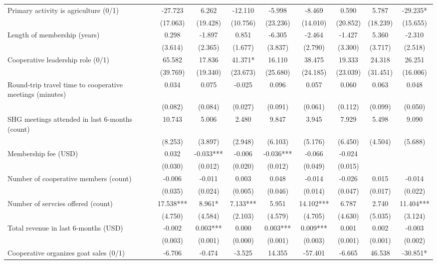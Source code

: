 \documentclass[11pt]{article}
\begin{document}
\begin{landscape}
\begin{table}[H]
{\begin{tabularx}{1.8\linewidth}{lcccccccc}
Primary activity is agriculture (0/1) & -27.723 & 6.262 & -12.110 & -5.998 & -8.469 & 0.590 & 5.787 & -29.235* \\
 & (17.063) & (19.428) & (10.756) & (23.236) & (14.010) & (20.852) & (18.239) & (15.655) \\
Length of membership (years) & 0.298 & -1.897 & 0.851 & -6.305 & -2.464 & -1.427 & 5.360 & -2.310 \\
 & (3.614) & (2.365) & (1.677) & (3.837) & (2.790) & (3.300) & (3.717) & (2.518) \\
Cooperative leadership role (0/1) & 65.582 & 17.836 & 41.371* & 16.110 & 38.475 & 19.333 & 24.318 & 26.251 \\
 & (39.769) & (19.340) & (23.673) & (25.680) & (24.185) & (23.039) & (31.451) & (16.006) \\
Round-trip travel time to cooperative meetings (minutes) & 0.034 & 0.075 & -0.025 & 0.096 & 0.057 & 0.060 & 0.063 & 0.048 \\
 & (0.082) & (0.084) & (0.027) & (0.091) & (0.061) & (0.112) & (0.099) & (0.050) \\
SHG meetings attended in last 6-months (count) & 10.743 & 5.006 & 2.480 & 9.847 & 3.945 & 7.929 & 5.498 & 9.090 \\
 & (8.253) & (3.897) & (2.948) & (6.103) & (5.176) & (6.450) & (4.504) & (5.688) \\
Membership fee (USD) & 0.032 & -0.033*** & -0.006 & -0.036*** & -0.066 & -0.024 &  &  \\
 & (0.030) & (0.012) & (0.020) & (0.012) & (0.049) & (0.015) &  &  \\
Number of cooperative members (count) & -0.006 & -0.011 & 0.003 & 0.048 & -0.014 & -0.026 & 0.015 & -0.014 \\
 & (0.035) & (0.024) & (0.005) & (0.046) & (0.014) & (0.047) & (0.017) & (0.022) \\
Number of servcies offered (count) & 17.538*** & 8.961* & 7.133*** & 5.951 & 14.102*** & 6.787 & 2.740 & 11.404*** \\
 & (4.750) & (4.584) & (2.103) & (4.579) & (4.705) & (4.630) & (5.035) & (3.124) \\
Total revenue in last 6-months (USD) & -0.002 & 0.003*** & 0.000 & 0.003*** & 0.009*** & 0.001 & 0.002 & -0.003 \\
 & (0.003) & (0.001) & (0.000) & (0.001) & (0.003) & (0.001) & (0.001) & (0.002) \\
Cooperative organizes goat sales (0/1) & -6.706 & -0.474 & -3.525 & 14.355 & -57.401 & -6.665 & 46.538 & -30.851* \\

\end{tabularx}}
\end{table}
\end{landscape}
\end{document}
